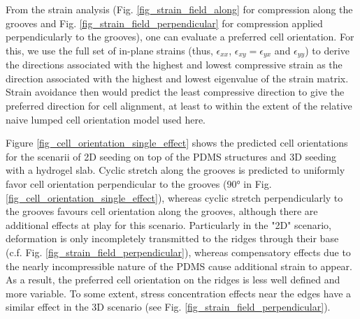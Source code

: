 \documentclass[11pt]{amsart}
\begin{document}
\begin{figure}
\end{figure}

From the strain analysis (Fig. \ref{fig_strain_field_along} for compression along the grooves and Fig. \ref{fig_strain_field_perpendicular} for compression applied perpendicularly to the grooves), one can evaluate a preferred cell orientation. For this, we use the full set of in-plane strains (thus, $\epsilon_{xx}$, $\epsilon_{xy}=\epsilon_{yx}$ and $\epsilon_{yy}$) to derive the directions associated with the highest and lowest compressive strain as the direction associated with the highest and lowest eigenvalue of the strain matrix. Strain avoidance then would predict the least compressive direction to give the preferred direction for cell alignment, at least to within the extent of the relative naive lumped cell orientation model used here.

Figure \ref{fig_cell_orientation_single_effect} shows the predicted cell orientations for the scenarii of 2D seeding on top of the PDMS structures and 3D seeding with a hydrogel slab. Cyclic stretch along the grooves is predicted to uniformly favor cell orientation perpendicular to the grooves (90° in Fig. \ref{fig_cell_orientation_single_effect}), whereas cyclic stretch perpendicularly to the grooves favours cell orientation along the grooves, although there are additional effects at play for this scenario. Particularly in the "2D" scenario, deformation is only incompletely transmitted to the ridges through their base (c.f. Fig. \ref{fig_strain_field_perpendicular}), whereas compensatory effects due to the nearly incompressible nature of the PDMS cause additional strain to appear. As a result, the preferred cell orientation on the ridges is less well defined and more variable. To some extent, stress concentration effects near the edges have a similar effect in the 3D scenario (see Fig. \ref{fig_strain_field_perpendicular}).
\end{document}
